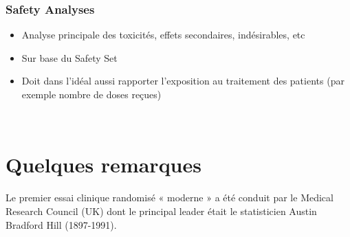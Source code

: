 \subsubsection{Safety Analyses}
\begin{itemize}
    \item Analyse principale des toxicités, effets secondaires,
indésirables, etc
    \item Sur base du Safety Set
    \item Doit dans l’idéal aussi rapporter l’exposition au traitement des patients (par exemple nombre de doses reçues)
\end{itemize}\\
\begin{center}
\end{center}


\section{Quelques remarques}
Le premier essai clinique randomisé « moderne » a été conduit par le Medical Research Council (UK) dont le principal leader était le statisticien Austin Bradford Hill (1897-1991).